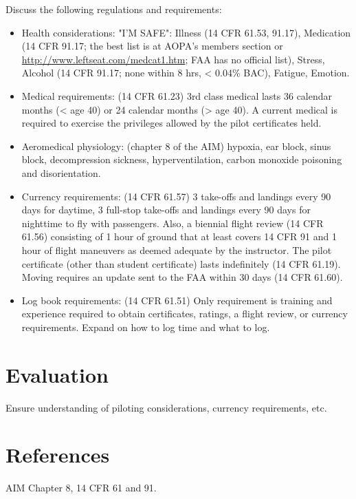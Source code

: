 \documentclass[twoside,openright]{report}
\begin{document}
Discuss the following regulations and requirements:

\begin{itemize}
  \item Health considerations: "I'M SAFE": Illness (14 CFR 61.53, 91.17),
    Medication (14 CFR 91.17; the best list is at AOPA's members section or
    \url{http://www.leftseat.com/medcat1.htm}; FAA has no official list),
    Stress, Alcohol (14 CFR 91.17; none within 8 hrs, < 0.04\% BAC), Fatigue,
    Emotion.

  \item Medical requirements: (14 CFR 61.23) 3rd class medical lasts 36
    calendar months (< age 40) or 24 calendar months (> age 40). A current
    medical is required to exercise the privileges allowed by the pilot
    certificates held.

  \item Aeromedical physiology: (chapter 8 of the AIM) hypoxia, ear block,
    sinus block, decompression sickness, hyperventilation, carbon monoxide
    poisoning and disorientation.

  \item Currency requirements: (14 CFR 61.57) 3 take-offs and landings every 90
    days for daytime, 3 full-stop take-offs and landings every 90 days for
    nighttime to fly with passengers. Also, a biennial flight review (14 CFR
    61.56) consisting of 1 hour of ground that at least covers 14 CFR 91 and 1
    hour of flight maneuvers as deemed adequate by the instructor. The pilot
    certificate (other than student certificate) lasts indefinitely (14 CFR
    61.19). Moving requires an update sent to the FAA within 30 days (14 CFR
    61.60).

  \item Log book requirements: (14 CFR 61.51) Only requirement is training and
    experience required to obtain certificates, ratings, a flight review, or
    currency requirements. Expand on how to log time and what to log.

\end{itemize}

\section{Evaluation}

Ensure understanding of piloting considerations, currency requirements, etc.

\section{References}

AIM Chapter 8, 14 CFR 61 and 91.
\end{document}
